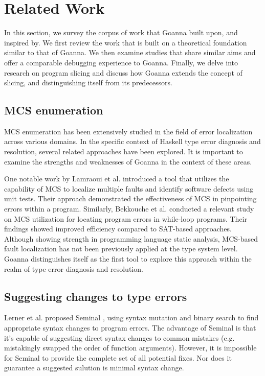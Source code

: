     \section{Related Work} 
    \label{sec:related-work}
    In this section, we survey the corpus of work that Goanna built upon, and inspired by. We first review the work that is built on a theoretical foundation similar to that of Goanna. We then examine studies that share similar aims and offer a comparable debugging experience to Goanna. Finally, we delve into research on program slicing and discuss how Goanna extends the concept of slicing, and distinguishing itself from its predecessors.



    \subsection{MCS enumeration}
	
    MCS enumeration has been extensively studied in the field of error localization across various domains. In the specific context of Haskell type error diagnosis and resolution, several related approaches have been explored. It is important to examine the strengths and weaknesses of Goanna in the context of these areas.

    One notable work by Lamraoui et al. introduced a tool \cite{Lamraoui2016-wr} that utilizes the capability of MCS to localize multiple faults and identify software defects using unit tests. Their approach demonstrated the effectiveness of MCS in pinpointing errors within a program. Similarly, Bekkouche et al. conducted a relevant study  \cite{Bekkouche2015-is}  on MCS utilization for locating program errors in while-loop programs. Their findings showed improved efficiency compared to SAT-based approaches. Although showing strength in programming language static analysis, MCS-based fault localization has not been previously applied at the type system level. Goanna distinguishes itself as the first tool to explore this approach within the realm of type error diagnosis and resolution.

    \subsection{Suggesting changes to type errors}
   Lerner et al. proposed Seminal \cite{Lerner2007-mu}, using syntax mutation and binary search to find appropriate syntax changes to program errors. The advantage of Seminal is that it's capable of suggesting direct syntax changes to common mistakes (e.g. mistakingly swapped the order of function arguments). However, it is impossible for Seminal to provide the complete set of all potential fixes. Nor does it guarantee a suggested sulution is minimal syntax change.
   
